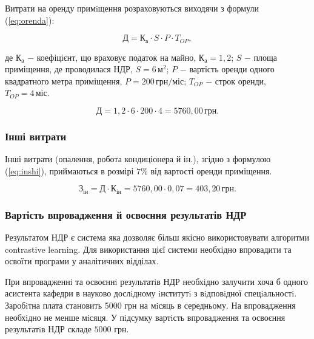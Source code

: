 Витрати на оренду примiщення розраховуються виходячи з формули (\ref{eq:orenda}):

\begin{equation}\label{eq:orenda}
\text{Д} = \text{К}_{\text{а}} \cdot S \cdot P \cdot T_{OP},
\end{equation}

\noindent де $\text{К}_{\text{а}}$ $-$ коефіцієнт, що враховує податок на майно, $\text{К}_{\text{а}} = 1,2$;\newline
\hspace*{19pt}$S$ $-$ площа приміщення, де проводилася НДР, $S = 6 \, \text{м}^{2}$;\newline
\hspace*{19pt}$P$ $-$ вартість оренди одного квадратного метра приміщення, $P = 200 \, \text{грн}/\text{міс}$;\newline
\hspace*{19pt}$T_{OP}$ $-$ строк оренди, $T_{OP} = 4 \, \text{міс}$.

\[
\text{Д} = 1,2 \cdot 6 \cdot 200 \cdot 4 = 5760,00 \, \text{грн}.
\]

\vspace{1.5em}

\subsubsection{Інші витрати}

Інші витрати (опалення, робота кондиціонера й ін.), згідно з формулою (\ref{eq:inshi}), приймаються в розмірі $7\%$ від вартості оренди приміщення. 

\begin{equation}\label{eq:inshi}
\text{З}_{\text{ін}} = \text{Д} \cdot \text{К}_{\text{ін}} = 5760,00 \cdot 0,07 = 403,20 \, \text{грн}. 
\end{equation}

\vspace{1.5em}

\subsubsection{Вартість впровадження й освоєння результатів НДР}

Результатом НДР є система яка дозволяє більш якісно використовувати алгоритми contrastive learning. Для використання цієї системи необхідно впровадити та освоїти програми у аналітичних відділах.

При впровадженнi та освоєннi результатiв НДР необхiдно залучити хоча б одного асистента кафедри в науково дослiдному iнститутi з вiдповiдної спецiальностi. Заробiтна плата становить 5000 грн на мiсяць в середньому. На впровадження необхiдно не менше мiсяця. У пiдсумку вартiсть впровадження та освоєння результатiв НДР складе $5000$ грн.

